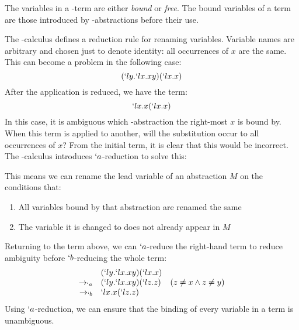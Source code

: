   The variables in a \lam-term are either \emph{bound} or \emph{free}. 
  The bound variables of a term are those introduced by \lam-abstractions before their use.
 
 
  The \lam-calculus defines a reduction rule for renaming variables.
  Variable names are arbitrary and chosen just to denote identity:
  all occurrences of $x$ are the same. This can become a problem
  in the following case:
  \[
    (`ly.`lx.xy)(`lx.x)
  \]
  After the application is reduced, we have the term:
  \[
    `lx.x(`lx.x) 
  \]
  In this case, it is ambiguous which \lam-abstraction the right-most $x$
  is bound by. When this term is applied to another, will the substitution
  occur to all occurrences of $x$? From the initial term, it is clear that
  this would be incorrect. The \lam-calculus introduces $`a$-reduction to
  solve this:
  \begin{figure}[H]
  \end{figure}
  This means we can rename the lead variable of an abstraction $M$ on the 
  conditions that: 
  \begin{enumerate}
    \item All variables bound by that abstraction are renamed the same 
    \item The variable it is changed to does not already appear in $M$ 
  \end{enumerate}
  Returning to the term above, we can $`a$-reduce the right-hand term to reduce ambiguity before $`b$-reducing the whole term:
  \[
  \begin{array}{rll}
             & (`ly.`lx.xy)(`lx.x) \\
    \to_{`a} & (`ly.`lx.xy)(`lz.z) & (z \not= x \land z \not= y) \\
    \to_{`b} & `lx.x(`lz.z)
  \end{array}
  \]
  Using $`a$-reduction, we can ensure that the binding of every variable in a term is unambiguous.
  
